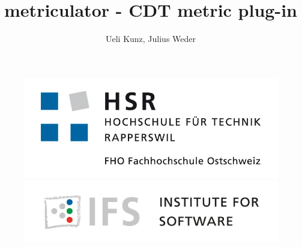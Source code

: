 \documentclass[11pt,a4paper,oneside]{scrreprt}
\title{metriculator - CDT metric plug-in}
\author{Ueli Kunz, Julius Weder}
\begin{document}
\begin{titlepage}
\topmargin 0in
\thispagestyle{empty}
\begin{center}


\begin{figure}[hp]
  \begin{minipage}[t]{0.5\textwidth}
	\vspace{0pt}
    \includegraphics[scale=0.25]{figures/HSR.jpg}
  \end{minipage}
  \hfill
  \begin{minipage}[t]{0.5\textwidth}
	\vspace{-2.5pt}
    \includegraphics[scale=0.35]{figures/IFS.jpg}
  \end{minipage}
\end{figure}



\end{center}
\end{titlepage}
\end{document}
